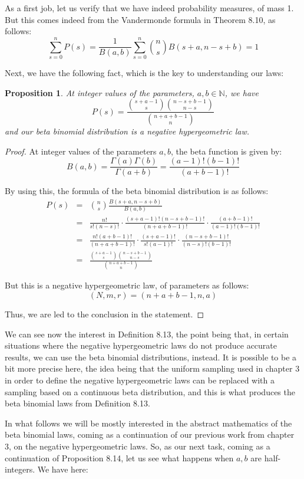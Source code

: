 \documentclass[12pt]{amsbook}
\newtheorem{proposition}[theorem]{Proposition}
\begin{document}
As a first job, let us verify that we have indeed probability measures, of mass 1. But this comes indeed from the Vandermonde formula in Theorem 8.10, as follows:
$$\sum_{s=0}^nP(s)
=\frac{1}{B(a,b)}\sum_{s=0}^n\binom{n}{s}B(s+a,n-s+b)
=1$$

Next, we have the following fact, which is the key to understanding our laws:

\begin{proposition}
At integer values of the parameters, $a,b\in\mathbb N$, we have
$$P(s)=\frac{\binom{s+a-1}{s}\binom{n-s+b-1}{n-s}}{\binom{n+a+b-1}{n}}$$
and our beta binomial distribution is a negative hypergeometric law.
\end{proposition}

\begin{proof}
At integer values of the parameters $a,b$, the beta function is given by:
$$B(a,b)=\frac{\Gamma(a)\Gamma(b)}{\Gamma(a+b)}=\frac{(a-1)!(b-1)!}{(a+b-1)!}$$

By using this, the formula of the beta binomial distribution is as follows:
\begin{eqnarray*}
P(s)
&=&\binom{n}{s}\frac{B(s+a,n-s+b)}{B(a,b)}\\
&=&\frac{n!}{s!(n-s)!}\cdot\frac{(s+a-1)!(n-s+b-1)!}{(n+a+b-1)!}\cdot\frac{(a+b-1)!}{(a-1)!(b-1)!}\\
&=&\frac{n!(a+b-1)!}{(n+a+b-1)!}\cdot\frac{(s+a-1)!}{s!(a-1)!}\cdot\frac{(n-s+b-1)!}{(n-s)!(b-1)!}\\
&=&\frac{\binom{s+a-1}{s}\binom{n-s+b-1}{n-s}}{\binom{n+a+b-1}{n}}
\end{eqnarray*}

But this is a negative hypergeometric law, of parameters as follows:
$$(N,m,r)=(n+a+b-1,n,a)$$

Thus, we are led to the conclusion in the statement.
\end{proof}

We can see now the interest in Definition 8.13, the point being that, in certain situations where the negative hypergeometric laws do not produce accurate results, we can use the beta binomial distributions, instead. It is possible to be a bit more precise here, the idea being that the uniform sampling used in chapter 3 in order to define the negative hypergeometric laws can be replaced with a sampling based on a continuous beta distribution, and this is what produces the beta binomial laws from Definition 8.13.

\bigskip

In what follows we will be mostly interested in the abstract mathematics of the beta binomial laws, coming as a continuation of our previous work from chapter 3, on the negative hypergeometric laws. So, as our next task, coming as a continuation of Proposition 8.14, let us see what happens when $a,b$ are half-integers. We have here:
\end{document}
